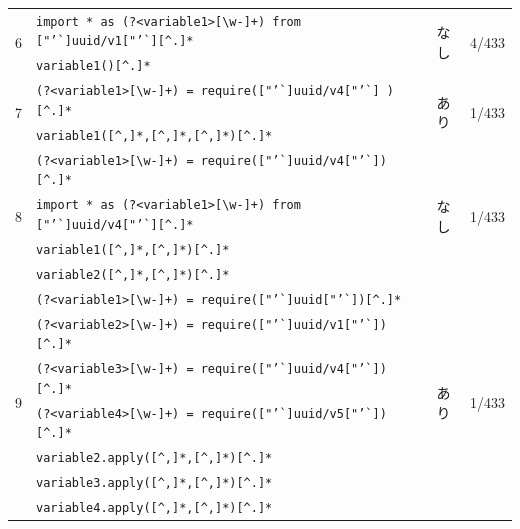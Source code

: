 \documentclass[11pt]{jreport}
\begin{document}
\begin{table}[t]
{\begin{tabular}{c|l|c|r}
            \multirow{2}{*}{6} & \texttt{import * as (?\textless{}variable1\textgreater{}{[}\textbackslash{}w-{]}+) from ["'\`{}]uuid/v1["'\`{}][\^{}.]*} & \multirow{2}{*}{なし}  &  \multirow{2}{*}{4/433} \\ \cline{2-2}
            & \texttt{variable1()[\^{}.]*} & & \\ \hline
            
            \multirow{2}{*}{7} & \texttt{(?\textless{}variable1\textgreater{}{[}\textbackslash{}w-{]}+) = require(["'\`{}]uuid/v4["'\`{}] )[\^{}.]*} & \multirow{2}{*}{あり} & \multirow{2}{*}{1/433}  \\ \cline{2-2}
            & \texttt{variable1([\textasciicircum,]*,[\textasciicircum,]*,[\textasciicircum,]*)[\^{}.]*} & & \\ \hline
            
            \multirow{4}{*}{8} & \texttt{(?\textless{}variable1\textgreater{}{[}\textbackslash{}w-{]}+) = require(["'\`{}]uuid/v4["'\`{}])[\^{}.]*} & \multirow{4}{*}{なし} & \multirow{4}{*}{1/433}  \\
            & \texttt{import * as (?\textless{}variable1\textgreater{}{[}\textbackslash{}w-{]}+) from ["'\`{}]uuid/v4["'\`{}][\^{}.]*} & & \\ \cline{2-2}
            & \texttt{variable1([\textasciicircum,]*,[\textasciicircum,]*)[\^{}.]*}& & \\ 
            & \texttt{variable2([\textasciicircum,]*,[\textasciicircum,]*)[\^{}.]*}& & \\ \hline
            
            \multirow{7}{*}{9} & \texttt{(?\textless{}variable1\textgreater{}{[}\textbackslash{}w-{]}+) = require(["'\`{}]uuid["'\`{}])[\^{}.]*} & \multirow{7}{*}{あり} & \multirow{7}{*}{1/433} \\ 
            & \texttt{(?\textless{}variable2\textgreater{}{[}\textbackslash{}w-{]}+) = require(["'\`{}]uuid/v1["'\`{}])[\^{}.]*} & & \\
            & \texttt{(?\textless{}variable3\textgreater{}{[}\textbackslash{}w-{]}+) = require(["'\`{}]uuid/v4["'\`{}])[\^{}.]*} & & \\
            & \texttt{(?\textless{}variable4\textgreater{}{[}\textbackslash{}w-{]}+) = require(["'\`{}]uuid/v5["'\`{}])[\^{}.]*} & & \\ \cline{2-2}
            
            & \texttt{variable2.apply([\textasciicircum,]*,[\textasciicircum,]*)[\^{}.]*}& & \\ 
            & \texttt{variable3.apply([\textasciicircum,]*,[\textasciicircum,]*)[\^{}.]*}& & \\
            & \texttt{variable4.apply([\textasciicircum,]*,[\textasciicircum,]*)[\^{}.]*}& & \\ \hline
        \end{tabular}
    }
\end{table}
\end{document}
